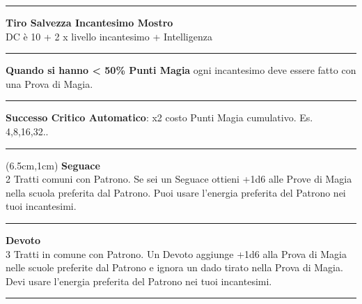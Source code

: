 \documentclass[a4paper,12 pt,openany]{book}
\newcommand{\riga}{\rule{\textwidth}{0.4pt}}
\begin{document}
\begin{textblock*}{5cm}
\riga

\textbf{Tiro Salvezza Incantesimo Mostro}\\
DC è 10 + 2 x livello incantesimo + Intelligenza

\riga

\textbf{Quando si hanno < 50\% Punti Magia} ogni incantesimo deve essere fatto con una Prova di Magia.

\riga

\textbf{Successo Critico Automatico}:  x2 costo Punti Magia cumulativo. Es. 4,8,16,32..

\riga

\end{textblock*}


\begin{textblock*}{13.5cm}(6.5cm,1cm) %
\textbf{Seguace}\\
2 Tratti comuni con Patrono. Se sei un Seguace ottieni +1d6 alle Prove di Magia nella scuola preferita dal Patrono. Puoi usare l'energia preferita del Patrono nei tuoi incantesimi.\\

\riga

\textbf{Devoto}\\
3 Tratti in comune con Patrono. Un Devoto aggiunge +1d6 alla Prova di Magia nelle scuole preferite dal Patrono e ignora un dado tirato nella Prova di Magia. Devi usare l'energia preferita del Patrono nei tuoi incantesimi.

\riga


\end{textblock*}
\end{document}
